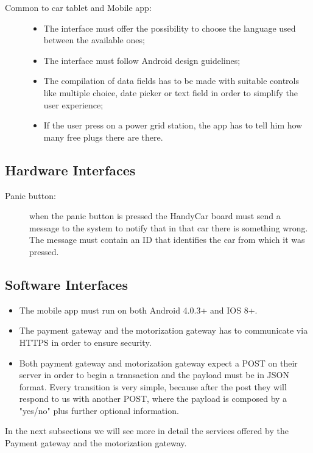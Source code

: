 \begin{description}
\begin{itemize}
	\end{itemize}
\item[Common to car tablet and Mobile app:]
\begin{itemize}
	\item The interface must offer the possibility to choose the language used between the available ones;
	\item The interface must follow Android design guidelines;
	\item The compilation of data fields has to be made with suitable controls like multiple choice, date picker or text field in order to simplify the user experience;
	\item If the user press on a power grid station, the app has to tell him how many free plugs there are there.
	\end{itemize}
\end{description}

\subsection{Hardware Interfaces}
\begin{description}
	\item [Panic button:] when the panic button is pressed the HandyCar board must send a message to the system to notify that in that car there is something wrong. The message must contain an ID that identifies the car from which it was pressed.
\end{description}

\subsection{Software Interfaces}
\begin{itemize}
\item The mobile app must run on both Android 4.0.3+ and IOS 8+.
\item The payment gateway and the motorization gateway has to communicate via HTTPS in order to ensure security.
\item Both payment gateway and motorization gateway expect a POST on their server in order to begin a transaction and the payload must be in JSON format. Every transition is very simple, because after the post they will respond to us with another POST, where the payload is composed by a "yes/no" plus further optional information.
\end{itemize}

In the next subsections we will see more in detail the services offered by the Payment gateway and the motorization gateway.

